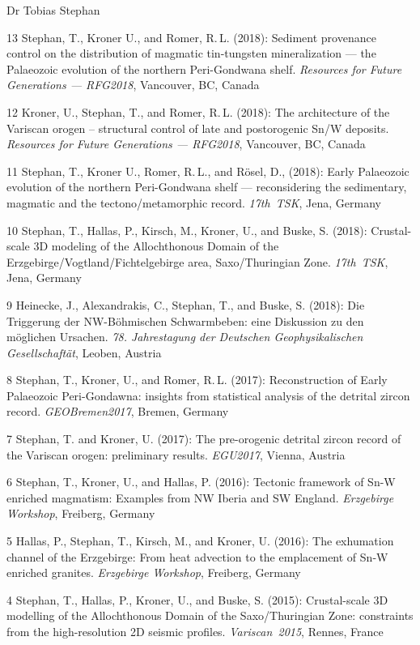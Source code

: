 \documentclass[10pt, paper=letter]{scrartcl} %
\begin{document}
\begin{cv}{\textsf{Dr Tobias Stephan}}
\begin{cvlist}{}
        \item[13] Stephan, T., Kroner U., and Romer, R.\,L. (2018): Sediment provenance control on the distribution of magmatic tin-tungsten mineralization --- the Palaeozoic evolution of the northern Peri-Gondwana shelf. \textit{Resources for Future Generations --- RFG2018}, Vancouver, BC, Canada
        \item[12]Kroner, U., Stephan, T., and Romer, R.\,L. (2018): The architecture of the Variscan orogen – structural control of late and postorogenic Sn/W deposits.  \textit{Resources for Future Generations --- RFG2018}, Vancouver, BC, Canada
        \item[11] Stephan, T., Kroner U., Romer, R.\,L., and R\"osel, D., (2018): Early Palaeozoic evolution of the northern Peri-Gondwana shelf --- reconsidering the sedimentary, magmatic and the tectono\-/metamorphic record. \mbox{\textit{17th TSK}}, Jena, Germany
        \item[10] Stephan, T., Hallas, P., Kirsch, M., Kroner, U., and Buske, S. (2018): Crustal-scale 3D modeling of the Allochthonous Domain of the Erzgebirge\-/Vogtland\-/Fichtelgebirge area, Saxo\-/Thuringian Zone. \textit{17th~TSK}, Jena, Germany
        \item[9] Heinecke, J., Alexandrakis, C., Stephan, T., and Buske, S. (2018): Die Triggerung der NW-B\"ohmischen Schwarmbeben: eine Diskussion zu den m\"oglichen Ursachen. \textit{78. Jahrestagung der Deutschen Geophysikalischen Gesellschaft\"at}, Leoben, Austria
        \item[8] Stephan, T., Kroner, U., and Romer, R.\,L. (2017): Reconstruction of Early Palaeozoic Peri-Gondawna: insights from statistical analysis of the detrital zircon record. \textit{GEOBremen2017}, Bremen, Germany
        \item[7] Stephan, T. and Kroner, U. (2017): The pre-orogenic detrital zircon record of the Variscan orogen: preliminary results. \textit{EGU2017}, \mbox{Vienna}, Austria
        \item[6] Stephan, T., Kroner, U., and Hallas, P. (2016): Tectonic framework of \mbox{Sn-W} enriched magmatism: Examples from NW Iberia and SW England. \textit{Erzgebirge Workshop}, Freiberg, Germany
        \item[5] Hallas, P., Stephan, T., Kirsch, M., and Kroner, U.  (2016): The exhumation channel of the Erzgebirge: From heat advection to the emplacement of Sn-W enriched granites. \textit{Erzgebirge Workshop}, Freiberg, Germany
        \item[4] Stephan, T., Hallas, P., Kroner, U., and Buske, S. (2015): Crustal-scale 3D modelling of the Allochthonous Domain of the Saxo\-/Thuringian Zone: constraints from the high-resolution 2D seismic profiles. \mbox{\textit{Variscan 2015}}, Rennes, France

\end{cvlist}
\end{cv}
\end{document}
